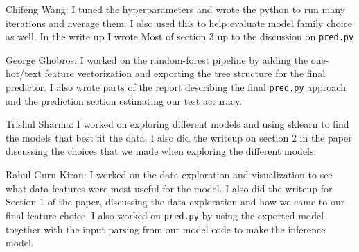 \documentclass[12pt]{article}
\begin{document}
  Chifeng Wang: I tuned the hyperparameters and wrote the python to run many iterations and average them. I also used this to help evaluate model family choice as well. In the write up I wrote Most of section 3 up to  the discussion on \texttt{pred.py}

  George Ghobros: I worked on the random-forest pipeline by adding the one-hot/text feature vectorization and exporting the tree structure for the final predictor. I also wrote parts of the report describing the final \texttt{pred.py} approach and the prediction section estimating our test accuracy.

  Trishul Sharma: I worked on exploring different models and using sklearn to find the models that best fit the data. I also did the writeup on section 2 in the paper discussing the choices that we made when exploring the different models.

  Rahul Guru Kiran: I worked on the data exploration and visualization to see what data features were most useful for the model. I also did the writeup for Section 1 of the paper, discussing the data exploration and how we came to our final feature choice. I also worked on \texttt{pred.py} by using the exported model together with the input parsing from our model code to make the inference model.




\end{document}
